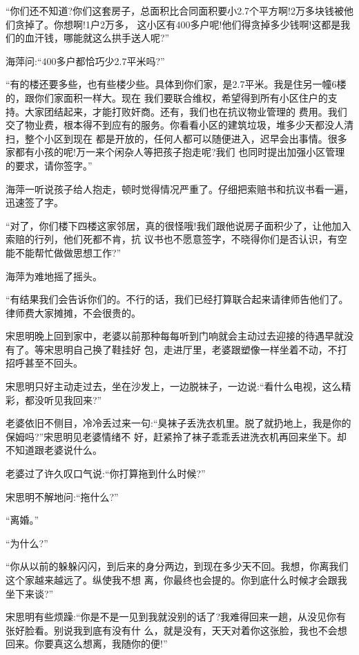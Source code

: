 \documentclass[11pt,a4paper,onecolumn]{article}
\begin{document}
``你们还不知道?你们这套房子，总面积比合同面积要小2.7个平方啊!2万多块钱被他们贪掉了。你想啊!1户2万多，
这小区有400多户呢!他们得贪掉多少钱啊!这都是我们的血汗钱，哪能就这么拱手送人呢?''

海萍问:``400多户都恰巧少2.7平米吗?''

``有的楼还要多些，也有些楼少些。具体到你们家，是2.7平米。我是住另一幢6楼的，跟你们家面积一样大。现在
我们要联合维权，希望得到所有小区住户的支持。大家团结起来，才能打败奸商。还有，我们也在抗议物业管理的
费用。我们交了物业费，根本得不到应有的服务。你看看小区的建筑垃圾，堆多少天都没人清扫，整个小区到现在
都是开放的，任何人都可以随便进入，迟早会出事情。很多家都有小孩的呢!万一来个闲杂人等把孩子抱走呢?我们
也同时提出加强小区管理的要求，请你签字。''

海萍一听说孩子给人抱走，顿时觉得情况严重了。仔细把索赔书和抗议书看一遍，迅速签了字。

``对了，你们楼下四楼这家邻居，真的很怪哦!我们跟他说房子面积少了，让他加入索赔的行列，他们死都不肯，抗
议书也不愿意签字，不晓得你们是否认识，有空能不能帮忙做做思想工作?''

海萍为难地摇了摇头。

``有结果我们会告诉你们的。不行的话，我们已经打算联合起来请律师告他们了。律师费大家摊摊，不会很贵的。

宋思明晚上回到家中，老婆以前那种每每听到门响就会主动过去迎接的待遇早就没有了。等宋思明自己换了鞋挂好
包，走进厅里，老婆跟塑像一样坐着不动，不打招呼甚至不回头。

宋思明只好主动走过去，坐在沙发上，一边脱袜子，一边说:``看什么电视，这么精彩，都没听见我回来?''

老婆依旧不侧目，冷冷丢过来一句:``臭袜子丢洗衣机里。脱了就扔地上，我是你的保姆吗?''宋思明见老婆情绪不
好，赶紧拎了袜子乖乖丢进洗衣机再回来坐下。却不知道跟老婆说什么。

老婆过了许久叹口气说:``你打算拖到什么时候?''

宋思明不解地问:``拖什么?''

``离婚。''

``为什么?''

``你从以前的躲躲闪闪，到后来的身分两边，到现在多少天不回。我想，你离我们这个家越来越远了。纵使我不想
离，你最终也会提的。你到底什么时候才会跟我坐下来谈?''

宋思明有些烦躁:``你是不是一见到我就没别的话了?我难得回来一趟，从没见你有张好脸看。别说我到底有没有什
么，就是没有，天天对着你这张脸，我也不会想回来。你要真这么想离，我随你的便!''
\end{document}
